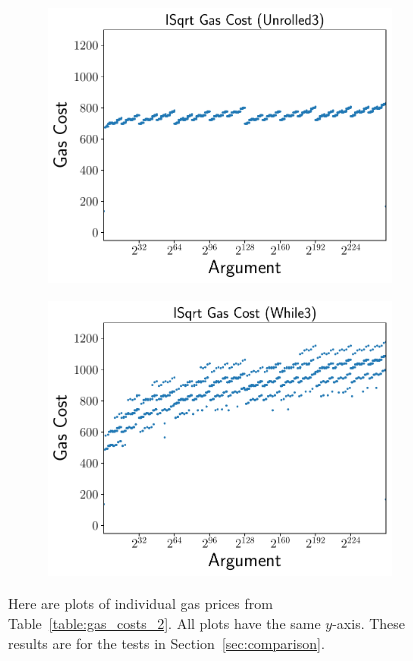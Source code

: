 \begin{figure}[p]
    \begin{subfigure}[t]{0.45\textwidth}
    \includegraphics[width=\textwidth]{plots/plot_Unrolled3.pdf}
    \end{subfigure}
    \begin{subfigure}[t]{0.45\textwidth}
    \includegraphics[width=\textwidth]{plots/plot_While3.pdf}
    \end{subfigure}
    \caption{Here are plots of individual gas prices from
        Table~\ref{table:gas_costs_2}.
        All plots have the same $y$-axis.
        These results are for the tests in Section~\ref{sec:comparison}.
        }
    \label{fig:gas_plots_2}
\end{figure}
